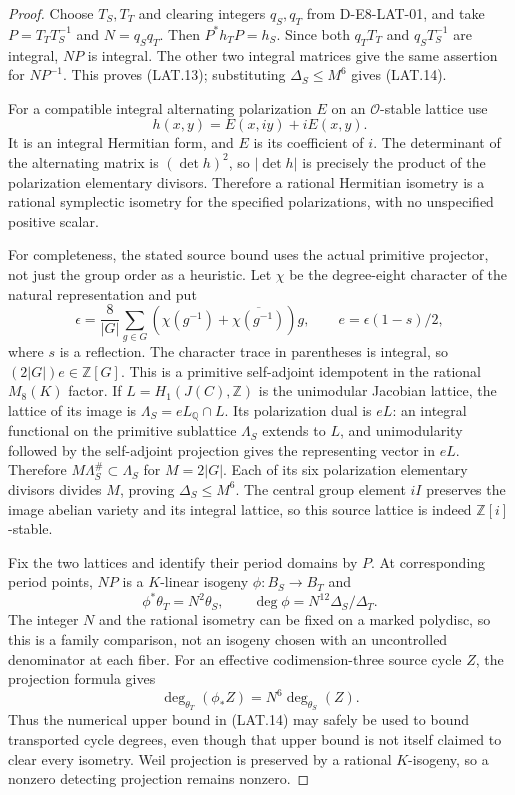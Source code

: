 \begin{proof}
Choose $T_S,T_T$ and clearing integers $q_S,q_T$ from
D-E8-LAT-01, and take
$P=T_TT_S^{-1}$ and $N=q_Sq_T$.  Then
$P^*h_TP=h_S$.  Since both $q_TT_T$ and $q_ST_S^{-1}$
are integral, $NP$ is integral.  The other two integral
matrices give the same assertion for $NP^{-1}$.  This proves
(LAT.13); substituting $\Delta_S\le M^6$ gives (LAT.14).

For a compatible integral alternating polarization $E$ on an
$\mathcal O$-stable lattice use
\[
                 h(x,y)=E(x,iy)+iE(x,y).                     \tag{LAT.15}
\]
It is an integral Hermitian form, and $E$ is its coefficient
of $i$.  The determinant of the alternating matrix is
$(\det h)^2$, so $|\det h|$ is precisely the product of the
polarization elementary divisors.  Therefore a rational
Hermitian isometry is a rational symplectic isometry for the
specified polarizations, with no unspecified positive scalar.

For completeness, the stated source bound uses the actual
primitive projector, not just the group order as a heuristic.
Let $\chi$ be the degree-eight character of the natural
representation and put
\[
 \epsilon=\frac8{|G|}\sum_{g\in G}
       (\chi(g^{-1})+\overline{\chi(g^{-1})})g,\qquad
                   e=\epsilon(1-s)/2,
\]
where $s$ is a reflection.  The character trace in parentheses
is integral, so $(2|G|)e\in\mathbb Z[G]$.  This is a primitive
self-adjoint idempotent in the rational $M_8(K)$ factor.
If $L=H_1(J(C),\mathbb Z)$ is the unimodular Jacobian lattice,
the lattice of its image is $\Lambda_S=eL_{\mathbb Q}\cap L$.
Its polarization dual is $eL$: an integral functional on the
primitive sublattice $\Lambda_S$ extends to $L$, and
unimodularity followed by the self-adjoint projection gives
the representing vector in $eL$.  Therefore
$M\Lambda_S^\#\subset\Lambda_S$ for $M=2|G|$.
Each of its six polarization elementary divisors divides $M$,
proving $\Delta_S\le M^6$.  The central group element $iI$
preserves the image abelian variety and its integral lattice,
so this source lattice is indeed $\mathbb Z[i]$-stable.

Fix the two lattices and identify their period domains by $P$.
At corresponding period points, $NP$ is a $K$-linear isogeny
$\phi:B_S\to B_T$ and
\[
                \phi^*\theta_T=N^2\theta_S,
 \qquad \deg\phi=N^{12}\Delta_S/\Delta_T.                    \tag{LAT.16}
\]
The integer $N$ and the rational isometry can be fixed on a
marked polydisc, so this is a family comparison, not an
isogeny chosen with an uncontrolled denominator at each fiber.
For an effective codimension-three source cycle $Z$,
the projection formula gives
\[
                  \deg_{\theta_T}(\phi_*Z)
                      =N^6\deg_{\theta_S}(Z).                \tag{LAT.17}
\]
Thus the numerical upper bound in (LAT.14) may safely be used
to bound transported cycle degrees, even though that upper
bound is not itself claimed to clear every isometry.  Weil
projection is preserved by a rational $K$-isogeny, so a
nonzero detecting projection remains nonzero.
\end{proof}

